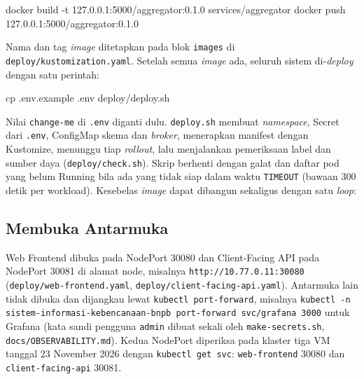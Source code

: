 \begin{codebox}
docker build -t 127.0.0.1:5000/aggregator:0.1.0 services/aggregator
docker push 127.0.0.1:5000/aggregator:0.1.0
\end{codebox}

Nama dan tag \textit{image} ditetapkan pada blok \texttt{images} di \texttt{deploy/kustomization.yaml}. Setelah semua \textit{image} ada, seluruh sistem di-\textit{deploy} dengan satu perintah:

\begin{codebox}
cp .env.example .env
deploy/deploy.sh
\end{codebox}

Nilai \texttt{change-me} di \texttt{.env} diganti dulu. \texttt{deploy.sh} membuat \textit{namespace}, Secret dari \texttt{.env}, ConfigMap skema dan \textit{broker}, menerapkan manifest dengan Kustomize, menunggu tiap \textit{rollout}, lalu menjalankan pemeriksaan label dan sumber daya (\texttt{deploy/check.sh}). Skrip berhenti dengan galat dan daftar pod yang belum Running bila ada yang tidak siap dalam waktu \texttt{TIMEOUT} (bawaan 300 detik per workload). Kesebelas \textit{image} dapat dibangun sekaligus dengan satu \textit{loop}:


\subsection{Membuka Antarmuka}

Web Frontend dibuka pada NodePort 30080 dan Client-Facing API pada NodePort 30081 di alamat node, misalnya \texttt{http://10.77.0.11:30080} (\texttt{deploy/web-frontend.yaml}, \texttt{deploy/client-facing-api.yaml}). Antarmuka lain tidak dibuka dan dijangkau lewat \texttt{kubectl port-forward}, misalnya \texttt{kubectl -n sistem-informasi-kebencanaan-bnpb port-forward svc/grafana 3000} untuk Grafana (kata sandi pengguna \texttt{admin} dibuat sekali oleh \texttt{make-secrets.sh}, \texttt{docs/OBSERVABILITY.md}). Kedua NodePort diperiksa pada klaster tiga VM tanggal 23 November 2026 dengan \texttt{kubectl get svc}: \texttt{web-frontend} 30080 dan \texttt{client-facing-api} 30081.

